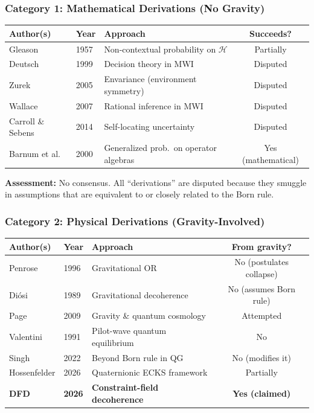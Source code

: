 \documentclass[11pt,a4paper]{article}
\begin{document}
\subsubsection{Category 1: Mathematical Derivations (No Gravity)}

\begin{center}
\begin{tabular}{lllc}
\toprule
\textbf{Author(s)} & \textbf{Year} & \textbf{Approach} & \textbf{Succeeds?} \\
\midrule
Gleason & 1957 & Non-contextual probability on $\mathcal{H}$ & Partially \\
Deutsch & 1999 & Decision theory in MWI & Disputed \\
Zurek & 2005 & Envariance (environment symmetry) & Disputed \\
Wallace & 2007 & Rational inference in MWI & Disputed \\
Carroll \& Sebens & 2014 & Self-locating uncertainty & Disputed \\
Barnum et al. & 2000 & Generalized prob.\ on operator algebras & Yes (mathematical) \\
\bottomrule
\end{tabular}
\end{center}

\textbf{Assessment:} No consensus. All ``derivations'' are disputed because they smuggle in assumptions that are equivalent to or closely related to the Born rule.

\subsubsection{Category 2: Physical Derivations (Gravity-Involved)}

\begin{center}
\begin{tabular}{lllc}
\toprule
\textbf{Author(s)} & \textbf{Year} & \textbf{Approach} & \textbf{From gravity?} \\
\midrule
Penrose & 1996 & Gravitational OR & No (postulates collapse) \\
Di\'{o}si & 1989 & Gravitational decoherence & No (assumes Born rule) \\
Page & 2009 & Gravity \& quantum cosmology & Attempted \\
Valentini & 1991 & Pilot-wave quantum equilibrium & No \\
Singh & 2022 & Beyond Born rule in QG & No (modifies it) \\
Hossenfelder & 2026 & Quaternionic ECKS framework & Partially \\
\textbf{DFD} & \textbf{2026} & \textbf{Constraint-field decoherence} & \textbf{Yes (claimed)} \\
\bottomrule
\end{tabular}
\end{center}
\end{document}

